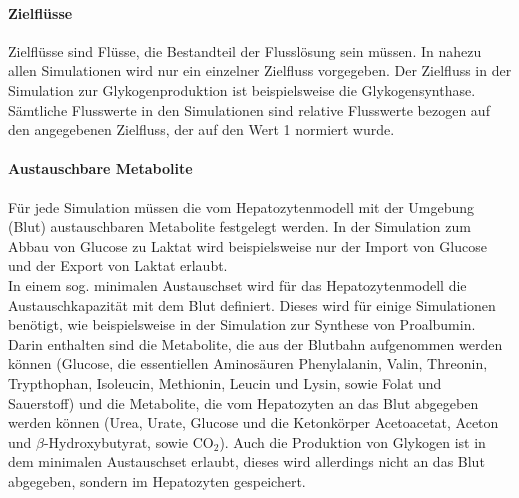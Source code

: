 \paragraph{Zielflüsse}
Zielflüsse sind Flüsse, die Bestandteil der Flusslösung sein müssen. In nahezu allen Simulationen wird nur ein einzelner Zielfluss vorgegeben. Der Zielfluss in der Simulation zur Glykogenproduktion ist beispielsweise die Glykogensynthase. Sämtliche Flusswerte in den Simulationen sind relative Flusswerte bezogen auf den angegebenen Zielfluss, der auf den Wert 1 normiert wurde.

\paragraph{Austauschbare Metabolite}
Für jede Simulation müssen die vom Hepatozytenmodell mit der Umgebung (Blut) austauschbaren Metabolite festgelegt werden. In der Simulation zum Abbau von Glucose zu Laktat wird beispielsweise nur der Import von Glucose und der Export von Laktat erlaubt.\\
In einem sog. minimalen Austauschset wird für das Hepatozytenmodell die Austauschkapazität mit dem Blut definiert. Dieses wird für einige Simulationen benötigt, wie beispielsweise in der Simulation zur Synthese von Proalbumin. Darin enthalten sind die Metabolite, die aus der Blutbahn aufgenommen werden können (Glucose, die essentiellen Aminosäuren Phenylalanin, Valin, Threonin, Trypthophan, Isoleucin, Methionin, Leucin und Lysin, sowie Folat und Sauerstoff) und die Metabolite, die vom Hepatozyten an das Blut abgegeben werden können (Urea, Urate, Glucose und die Ketonkörper Acetoacetat, Aceton und $\beta$-Hydroxybutyrat, sowie $\text{CO}_2$). Auch die Produktion von Glykogen ist in dem minimalen Austauschset erlaubt, dieses wird allerdings nicht an das Blut abgegeben, sondern im Hepatozyten gespeichert.

